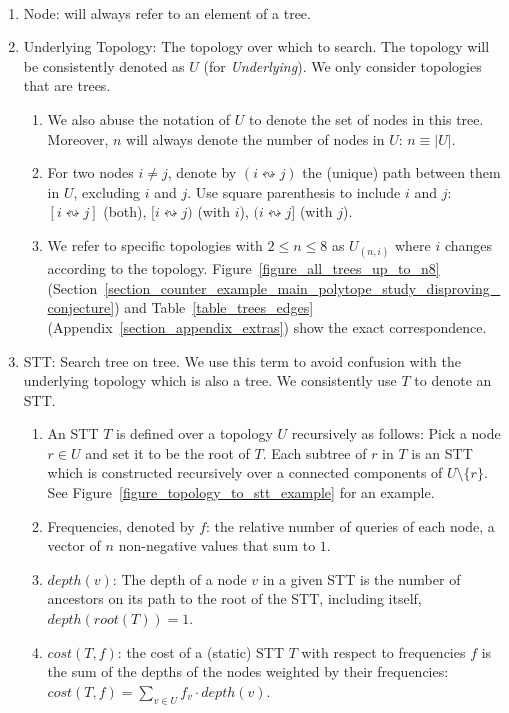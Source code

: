\begin{definition}$ $
\label{definitions_basics}

\begin{enumerate}
    \item Node: will always refer to an element of a tree.
    \item Underlying Topology: The topology over which to search. The topology will be consistently denoted as $U$ (for \emph{Underlying}). We  only consider topologies that are trees.
    \begin{enumerate}
        \item We also abuse the notation of $U$ to denote the set of nodes in this tree. Moreover, $n$ will always denote the number of nodes in $U$: $n \equiv |U|$.
        \item For two nodes $i \ne j$, denote by $(i \leftrightsquigarrow j)$ the (unique) path between them in $U$, excluding $i$ and $j$. Use square parenthesis to include $i$ and $j$: $[i \leftrightsquigarrow j]$ (both), $[i \leftrightsquigarrow j)$ (with $i$), $(i \leftrightsquigarrow j]$ (with $j$).
        \item We refer to specific topologies with $2 \le n \le 8$ as $U_{(n,i)}$ where $i$ changes according to the topology. Figure~\ref{figure_all_trees_up_to_n8} (Section~\ref{section_counter_example_main_polytope_study_disproving_conjecture}) and Table~\ref{table_trees_edges} (Appendix~\ref{section_appendix_extras}) show the exact correspondence.
    \end{enumerate}
    
    \item STT: Search tree on tree. We use this term to avoid confusion with the underlying topology which is also a tree. We consistently use $T$ to denote an STT.
    \begin{enumerate}
        \item An STT $T$ is defined over a topology $U$ recursively as follows: Pick a node $r \in U$ and set it to be the root of $T$. Each subtree of $r$  in $T$ is an STT which is  constructed recursively over a connected components of $U \setminus \{ r \}$. See Figure~\ref{figure_topology_to_stt_example} for an example.
        
        \item Frequencies, denoted by $f$: the relative number of queries of each node, a vector of $n$ non-negative values that sum to $1$.
        \item $depth(v)$: The depth of a node $v$ in a given STT is the number of ancestors on its path to the root of the STT, including itself, $depth(root(T))=1$.
        \item $cost(T,f)$: the cost of a (static) STT $T$ with respect to frequencies $f$ is the  sum of the depths of the nodes weighted by their frequencies: $cost(T,f) = \sum_{v \in U} f_v \cdot depth(v)$.
    \end{enumerate}


\end{enumerate}
\end{definition}
